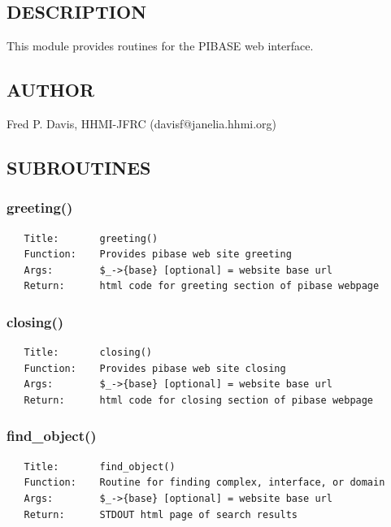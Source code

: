 \documentclass{article}
\begin{document}
\subsection*{DESCRIPTION\label{pibase::web_DESCRIPTION}}


This module provides routines for the PIBASE web interface.

\subsection*{AUTHOR\label{pibase::web_AUTHOR}}


Fred P. Davis, HHMI-JFRC (davisf@janelia.hhmi.org)

\subsection*{SUBROUTINES\label{pibase::web_SUBROUTINES}}
\subsubsection*{greeting()\label{pibase::web_greeting_}}
\begin{verbatim}
   Title:       greeting()
   Function:    Provides pibase web site greeting
   Args:        $_->{base} [optional] = website base url
   Return:      html code for greeting section of pibase webpage
\end{verbatim}
\subsubsection*{closing()\label{pibase::web_closing_}}
\begin{verbatim}
   Title:       closing()
   Function:    Provides pibase web site closing
   Args:        $_->{base} [optional] = website base url
   Return:      html code for closing section of pibase webpage
\end{verbatim}
\subsubsection*{find\_object()\label{pibase::web_find_object_}}
\begin{verbatim}
   Title:       find_object()
   Function:    Routine for finding complex, interface, or domain
   Args:        $_->{base} [optional] = website base url
   Return:      STDOUT html page of search results
\end{verbatim}
\end{document}
